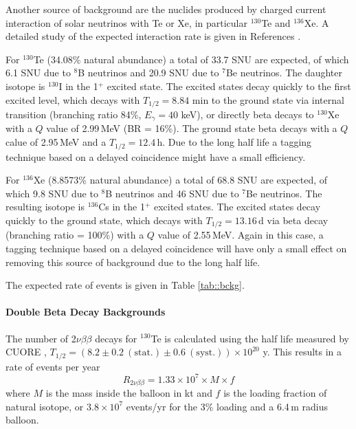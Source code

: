 Another source of background are the nuclides produced by charged current
interaction of solar neutrinos with Te or Xe, in particular $^{130}$Te and
$^{136}$Xe. A detailed study of the expected interaction rate is given in
References \cite{eijiri14, eijiri17}. 

For $^{130}$Te (34.08\% natural abundance) a total of 33.7 SNU are expected,
of which 6.1 SNU due to $^{8}$B neutrinos and 20.9 SNU due to $^{7}$Be
neutrinos. The daughter isotope is $^{130}$I in the 1$^{+}$ excited state.
The excited states decay quickly to the first excited level, which decays with
$T_{1/2}=8.84$ min to the ground state via internal transition (branching
ratio 84\%, $E_\gamma=40$ keV), or directly beta decays to $^{130}$Xe with a
$Q$ value of 2.99\,MeV (BR = 16\%). The ground state beta decays with a
$Q$ calue of 2.95\,MeV and a $T_{1/2}=12.4$\,h. Due to the long half life a
tagging technique based on a delayed coincidence might have a small efficiency.

For $^{136}$Xe (8.8573\% natural abundance) a total of 68.8 SNU are expected,
of which 9.8 SNU due to $^{8}$B neutrinos and 46 SNU due to $^{7}$Be neutrinos.
The resulting isotope is $^{136}$Cs in the 1$^{+}$ excited states. The
excited states decay quickly to the ground state, which decays with
$T_{1/2}=13.16$\,d via beta decay (branching ratio = 100\%) with a $Q$ value
of 2.55\,MeV. Again in this case, a tagging technique
based on a delayed coincidence will have only a small effect on removing this
source of background due to the long half life.

The expected rate of events is given in Table \ref{tab::bckg}.

\paragraph{Double Beta Decay Backgrounds}

The number of 2$\nu\beta\beta$ decays for $^{130}$Te is calculated using the
half life measured by CUORE \cite{Cuore017},
$T_{1/2}=(8.2\pm0.2~\mathrm{(stat.)}\pm0.6~\mathrm{(syst.)})\times 10^{20}$ y.
This results in a rate of events per year
\begin{equation}
R_{2\nu\beta\beta} = 1.33 \times 10^{7} \times M \times f
\end{equation} 
where $M$ is the mass inside the balloon in kt and $f$ is the loading fraction
of natural isotope, or $3.8\times10^7$ events/yr for the 3\% loading and a
6.4\,m radius balloon.\\
 
